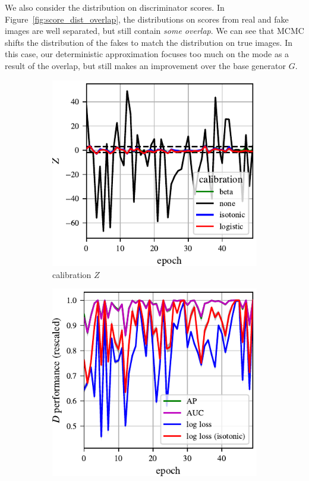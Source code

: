 \documentclass{article}
\begin{document}
We also consider the distribution on discriminator scores.
In Figure~\ref{fig:score_dist_overlap}, the distributions on scores from real and fake images are well separated, but still contain \emph{some overlap}.
We can see that MCMC shifts the distribution of the fakes to match the distribution on true images.
In this case, our deterministic approximation focuses too much on the mode as a result of the overlap, but still makes an improvement over the base generator $G$.

\begin{figure}
    \centering
    \begin{subfigure}[b]{0.49\textwidth}
       \centering
       \includegraphics[scale=0.9]{figures/disc_calib.pdf}
       \caption{calibration $Z$}
       \label{fig:calibration stat}
    \end{subfigure}
    \begin{subfigure}[b]{0.49\textwidth}
       \centering
       \includegraphics[scale=0.9]{figures/disc_perf.pdf}

\end{subfigure}
\end{figure}
\end{document}
